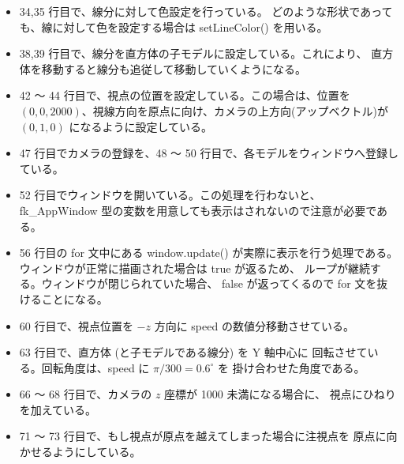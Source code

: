 \begin{itemize}
 \item 34,35 行目で、線分に対して色設定を行っている。
	どのような形状であっても、線に対して色を設定する場合は
	setLineColor() を用いる。

 \item 38,39 行目で、線分を直方体の子モデルに設定している。これにより、
	直方体を移動すると線分も追従して移動していくようになる。

 \item 42 〜 44 行目で、視点の位置を設定している。この場合は、位置を
	\((0, 0, 2000)\)、視線方向を原点に向け、カメラの上方向(アップベクトル)が
	\((0, 1, 0)\) になるように設定している。

 \item 47 行目でカメラの登録を、48 〜 50 行目で、各モデルをウィンドウへ登録している。

 \item 52 行目でウィンドウを開いている。この処理を行わないと、
	fk\_AppWindow 型の変数を用意しても表示はされないので注意が必要である。

 \item 56 行目の for 文中にある window.update() が実際に表示を行う処理である。
	ウィンドウが正常に描画された場合は true が返るため、
	ループが継続する。ウィンドウが閉じられていた場合、
	false が返ってくるので for 文を抜けることになる。

 \item 60 行目で、視点位置を \(-z\) 方向に speed の数値分移動させている。

 \item 63 行目で、直方体 (と子モデルである線分) を Y 軸中心に
	回転させている。回転角度は、speed に \(\pi/300 = 0.6 ^{\circ}\) を
	掛け合わせた角度である。


 \item 66 〜 68 行目で、カメラの \(z\) 座標が 1000 未満になる場合に、
	視点にひねりを加えている。

 \item 71 〜 73 行目で、もし視点が原点を越えてしまった場合に注視点を
	原点に向かせるようにしている。

\end{itemize}

